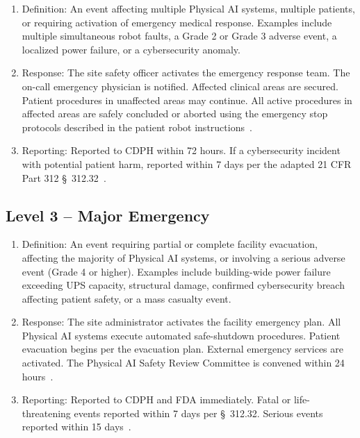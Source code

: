 \documentclass[11pt,letterpaper]{article}
\begin{document}
\begin{enumerate}[label=(\alph*)]
\item Definition: An event affecting multiple Physical AI systems, multiple
  patients, or requiring activation of emergency medical response. Examples
  include multiple simultaneous robot faults, a Grade 2 or Grade 3 adverse
  event, a localized power failure, or a cybersecurity anomaly.

\item Response: The site safety officer activates the emergency response team.
  The on-call emergency physician is notified. Affected clinical areas are
  secured. Patient procedures in unaffected areas may continue. All active
  procedures in affected areas are safely concluded or aborted using the
  emergency stop protocols described in the patient robot
  instructions~\cite{patientinstructions2026}.

\item Reporting: Reported to CDPH within 72 hours. If a cybersecurity incident
  with potential patient harm, reported within 7 days per the adapted 21 CFR
  Part 312 \S~312.32~\cite{cfr312adapt}.
\end{enumerate}

\subsection{Level 3 -- Major Emergency}

\begin{enumerate}[label=(\alph*)]
\item Definition: An event requiring partial or complete facility evacuation,
  affecting the majority of Physical AI systems, or involving a serious
  adverse event (Grade 4 or higher). Examples include building-wide power
  failure exceeding UPS capacity, structural damage, confirmed cybersecurity
  breach affecting patient safety, or a mass casualty event.

\item Response: The site administrator activates the facility emergency plan.
  All Physical AI systems execute automated safe-shutdown procedures. Patient
  evacuation begins per the evacuation plan. External emergency services are
  activated. The Physical AI Safety Review Committee is convened within 24
  hours~\cite{cfr312adapt}.

\item Reporting: Reported to CDPH and FDA immediately. Fatal or
  life-threatening events reported within 7 days per \S~312.32. Serious
  events reported within 15 days~\cite{cfr312adapt}.
\end{enumerate}
\end{document}
